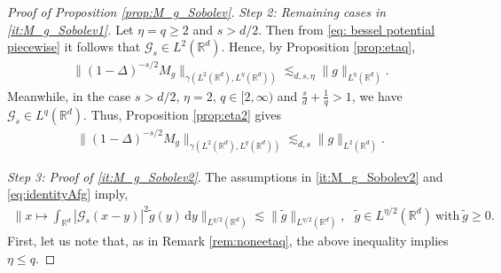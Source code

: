 \documentclass[reqno]{amsart}
\theoremstyle{plain}
\theoremstyle{remark}
\theoremstyle{plain}
\numberwithin{equation}{section}
\newcommand\bR{\mathbb{R}}
\newcommand\cG{\mathscr{G}}
\def\R{{\mathbb R}}
\newcommand{\wt}{\widetilde}
\newcommand{\di}{\mathrm{d}}
\newcommand{\1}{\one}
\begin{document}
\begin{proof}[Proof of Proposition \ref{prop:M_g_Sobolev}]
\smallskip

\emph{Step 2: Remaining cases in \eqref{it:M_g_Sobolev1}.}
Let $\eta=q\geq 2$ and $s>d/2$. Then from \eqref{eq: bessel potential piecewise} it follows that $\cG_s\in L^2(\bR^d)$. Hence, by Proposition \ref{prop:etaq},
\begin{align}
\label{eq: example Bessel pot estimate 2}
    \|(1-\Delta)^{-s/2} M_g\|_{\gamma(L^2(\R^d), L^\eta(\R^d))} \lesssim_{d,s,\eta} \|g\|_{L^\eta(\R^d)}.
\end{align}
Meanwhile, in the case $s>d/2$, $\eta=2$, $q\in [2,\infty)$ and $\frac{s}{d} + \frac{1}{q}  > 1$, we have $\cG_s\in L^q(\R^d)$. Thus, Proposition \ref{prop:eta2} gives
\begin{align}
    \|(1-\Delta)^{-s/2} M_g\|_{\gamma(L^2(\R^d), L^q(\R^d))} \lesssim_{d,s} \|g\|_{L^2(\R^d)}.
\end{align}

\smallskip


\emph{Step 3: Proof of \eqref{it:M_g_Sobolev2}}.
The assumptions in \eqref{it:M_g_Sobolev2} and  \eqref{eq:identityAfg} imply,
\begin{align}
\label{eq: cond tilde g Bessel}
\Big\|x\mapsto \int_{\R^d} |\cG_s(x-y)|^2  \wt{g}(y)\,\di y\Big\|_{L^{q/2}(\R^d)} 
 \lesssim \|\wt{ g}\|_{L^{\eta/2}(\R^d)}, \ \ \ \wt{g}\in L^{\eta/2}(\R^d) \ \text{with} \ \wt{g}\geq 0.
 \end{align}
First, let us note that, as in Remark \ref{rem:noneetaq}, the above inequality implies $\eta\leq q$. 


\end{proof}
\end{document}
